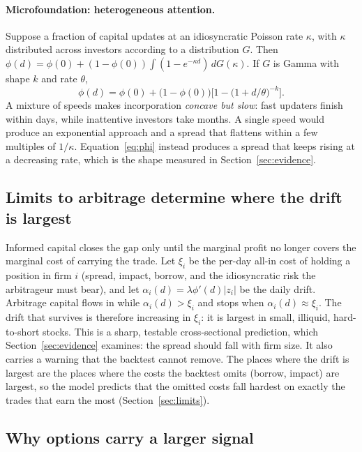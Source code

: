 \documentclass[11pt]{article}
\theoremstyle{definition}
\newcommand{\1}{\mathbf{1}}
\begin{document}
\paragraph{Microfoundation: heterogeneous attention.}
Suppose a fraction of capital updates at an idiosyncratic Poisson rate $\kappa$, with $\kappa$
distributed across investors according to a distribution $G$. Then
$\phi(d)=\phi(0)+(1-\phi(0))\int(1-e^{-\kappa d})\,dG(\kappa)$. If $G$ is Gamma with shape $k$ and
rate $\theta$,
\begin{equation}
  \phi(d)=\phi(0)+\big(1-\phi(0)\big)\Big[1-\big(1+d/\theta\big)^{-k}\Big].
  \label{eq:phi}
\end{equation}
A mixture of speeds makes incorporation \emph{concave but slow}: fast updaters finish within days,
while inattentive investors take months. A single speed would produce an exponential approach and
a spread that flattens within a few multiples of $1/\kappa$. Equation~\eqref{eq:phi} instead
produces a spread that keeps rising at a decreasing rate, which is the shape measured in
Section~\ref{sec:evidence}.

\subsection{Limits to arbitrage determine where the drift is largest}

Informed capital closes the gap only until the marginal profit no longer covers the marginal cost
of carrying the trade. Let $\xi_i$ be the per-day all-in cost of holding a position in firm $i$
(spread, impact, borrow, and the idiosyncratic risk the arbitrageur must bear), and let
$\alpha_i(d)=\lambda\phi'(d)|z_i|$ be the daily drift. Arbitrage capital flows in while
$\alpha_i(d)>\xi_i$ and stops when $\alpha_i(d)\approx\xi_i$. The drift that survives is therefore
increasing in $\xi_i$: it is largest in small, illiquid, hard-to-short stocks. This is a sharp,
testable cross-sectional prediction, which Section~\ref{sec:evidence} examines: the spread
should fall with firm size. It also carries a warning that the backtest cannot remove. The
places where the drift is largest are the places where the costs the backtest omits (borrow,
impact) are largest, so the model predicts that the omitted costs fall hardest on exactly the
trades that earn the most (Section~\ref{sec:limits}).

\subsection{Why options carry a larger signal}
\end{document}
